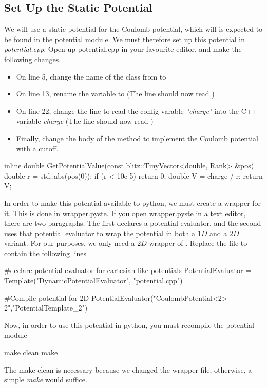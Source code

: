\subsection{Set Up the Static Potential}
We will use a static potential for the Coulomb potential, which will is expected to be found in the potential module. We must therefore set up this potential in \textit{potential.cpp}. Open up potential.cpp in your favourite editor, and make the following changes. 
\begin{itemize}
 \item On line 5, change the name of the class from  to 
 \item On line 13, rename the  variable to  (The line should now read )
 \item On line 22, change the line to read the config varable \textit{"charge"} into the C++ variable \textit{charge} (The line should now read )
 \item Finally, change the body of the method  to implement the Coulomb potential with a cutoff.
\end{itemize}
\begin{c++}
inline double GetPotentialValue(const blitz::TinyVector<double, Rank> &pos)
{
	double r = std::abs(pos(0));
	if (r < 10e-5)
	{
		return 0;
	}
	double V = charge / r;
	return V;
}
\end{c++}

In order to make this potential available to python, we must create a wrapper for it. This is done in wrapper.pyste. If you open
wrapper.pyste in a text editor, there are two paragraphs. The first declares a potential evaluator, and the second uses that 
potential evaluator to wrap the potential  in both a $1D$ and a $2D$ variant. For our purposes, we only
need a $2D$ wrapper of . Replace the file to contain the following lines
\begin{python}
#declare potential evaluator for cartesian-like potentials
PotentialEvaluator = Template("DynamicPotentialEvaluator", "potential.cpp")

#Compile potential for 2D
PotentialEvaluator("CoulombPotential<2> 2","PotentialTemplate_2")
\end{python}
Now, in order to use this potential in python, you must recompile the potential module
\begin{bash}
	make clean
	make
\end{bash}
The make clean is necessary because we changed the wrapper file, otherwise, a simple \textit{make} would suffice.

